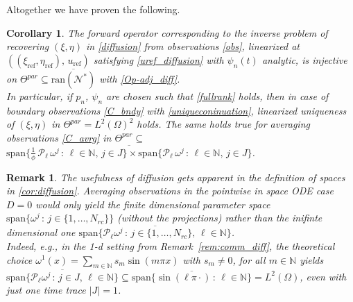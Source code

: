 \documentclass[12pt]{article}
\newtheorem{corollary}[theorem]{Corollary}
\newtheorem{remark}[theorem]{Remark}
\newcommand\Op{\mathcal{N}}
\newcommand\Proj{\mathcal{P}}
\newcommand\coilsens{\omega}
\newcommand\pot{\xi}
\newcommand\init{\eta}
\newcommand\contr{p}
\newcommand\Ncoil{N_{rc}}
\begin{document}
Altogether we have proven the following.
\begin{corollary}\label{cor:diffusion}
The forward operator corresponding to the inverse problem of recovering  $(\pot,\init)$ in \eqref{diffusion} from observations \eqref{obs}, linearized at $((\pot_{\text{ref}},\init_{\text{ref}}),\,u_{\text{ref}})$ satisfying \eqref{uref_diffusion} with $\psi_n(t)$ analytic, is injective on 
$\Theta^{par}\subseteq\overline{\text{ran}(\Op^*)}$ with \eqref{Op-adj_diff}.
\\
In particular, if $\contr_n$, $\psi_n$ are chosen such that \eqref{fullrank} holds, then in case of boundary observations \eqref{C_bndy} with \eqref{uniqueconinuation}, linearized uniqueness of $(\pot,\init)$ in $\Theta^{par}=L^2(\Omega)^2$ holds.
The same holds true for averaging observations \eqref{C_avrg} in $\Theta^{par}\subseteq$ \\
$\overline{\text{span}\{\frac{1}{\phi}\,\Proj_\ell\,\coilsens^j\, : \, \ell\in\mathbb{N}, \, j\in J\}\times\text{span}\{\Proj_\ell\,\coilsens^j\, : \, \ell\in\mathbb{N}, \, j\in J\}}$.
\end{corollary}

\begin{remark}\label{rem:diff}
The usefulness of diffusion gets apparent in the definition of spaces in \eqref{cor:diffusion}. Averaging observations in the pointwise in space ODE case $D=0$ would only yield the finite dimensional parameter space 
$\text{span}\{\coilsens^j\,:\, j\in\{1,\ldots,\Ncoil\}\}$ (without the projections) rather than the inifinte dimensional one 
$\overline{\text{span}\{\Proj_\ell\coilsens^j\,:\, j\in\{1,\ldots,\Ncoil\},\,\ell\in\mathbb{N}\}}$.
\\
Indeed, e.g., in the 1-d setting from Remark~\ref{rem:comm_diff}, the theoretical choice 
$\coilsens^1(x)=\sum_{m\in\mathbb{N}} s_m \sin(m\pi x)$ with $s_m\not=0$, for all $m\in\mathbb{N}$ yields  
$\overline{\text{span}\{\Proj_\ell\coilsens^j\,:\, j\in J,\,\ell\in\mathbb{N}\}}\subseteq\overline{\text{span}\{\sin(\ell\pi \cdot)\,:\, \ell\in\mathbb{N}\}}=L^2(\Omega)$,
even with just one time trace $|J|=1$.
\end{remark}
\end{document}
